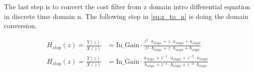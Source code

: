 The last step is to convert the cost filter from z domain intro differential equation in discrete time domain n. The following step in \autoref{eq:z_to_n} is doing the domain conversion.



\begin{subequations}\label{eq:bandstop_filter_peak_n}
\begin{alignat}{2}
 H_{stop}(z)=\frac{Y(z)}{X(z)} &=  \text{In_Gain} \cdot \frac{z^2 \cdot a_{stop1} + z \cdot a_{stop2} + a_{stop3}}{z^2 \cdot b_{stop1} + z \cdot b_{stop2} + b_{stop3}} \label{eq:bandstop_filter_peak_n_1}\\
 H_{stop}(z)=\frac{Y(z)}{X(z)} &=  \text{In_Gain} \cdot \frac{a_{stop1} + z^{-1} \cdot a_{stop2} +  z^{-2} \cdot a_{stop3}}{b_{stop1} + z^{-1} \cdot b_{stop2} +  z^{-2} \cdot b_{stop3}}  \label{eq:bandstop_filter_peak_n_2}
\end{alignat}
\end{subequations}


